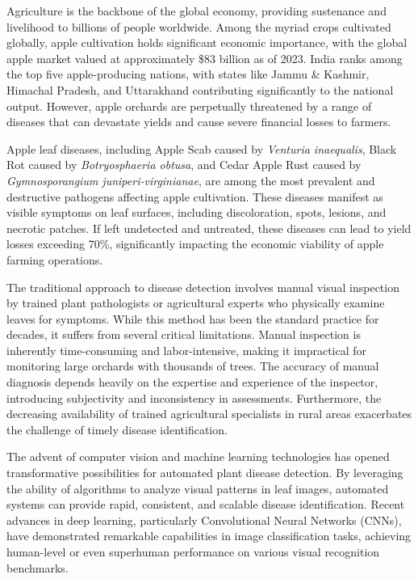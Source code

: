 \documentclass[12pt]{report}
\begin{document}
Agriculture is the backbone of the global economy, providing sustenance and livelihood to billions of people worldwide. Among the myriad crops cultivated globally, apple cultivation holds significant economic importance, with the global apple market valued at approximately \$83 billion as of 2023. India ranks among the top five apple-producing nations, with states like Jammu \& Kashmir, Himachal Pradesh, and Uttarakhand contributing significantly to the national output. However, apple orchards are perpetually threatened by a range of diseases that can devastate yields and cause severe financial losses to farmers.

Apple leaf diseases, including Apple Scab caused by \textit{Venturia inaequalis}, Black Rot caused by \textit{Botryosphaeria obtusa}, and Cedar Apple Rust caused by \textit{Gymnosporangium juniperi-virginianae}, are among the most prevalent and destructive pathogens affecting apple cultivation. These diseases manifest as visible symptoms on leaf surfaces, including discoloration, spots, lesions, and necrotic patches. If left undetected and untreated, these diseases can lead to yield losses exceeding 70\%, significantly impacting the economic viability of apple farming operations.

The traditional approach to disease detection involves manual visual inspection by trained plant pathologists or agricultural experts who physically examine leaves for symptoms. While this method has been the standard practice for decades, it suffers from several critical limitations. Manual inspection is inherently time-consuming and labor-intensive, making it impractical for monitoring large orchards with thousands of trees. The accuracy of manual diagnosis depends heavily on the expertise and experience of the inspector, introducing subjectivity and inconsistency in assessments. Furthermore, the decreasing availability of trained agricultural specialists in rural areas exacerbates the challenge of timely disease identification.

The advent of computer vision and machine learning technologies has opened transformative possibilities for automated plant disease detection. By leveraging the ability of algorithms to analyze visual patterns in leaf images, automated systems can provide rapid, consistent, and scalable disease identification. Recent advances in deep learning, particularly Convolutional Neural Networks (CNNs), have demonstrated remarkable capabilities in image classification tasks, achieving human-level or even superhuman performance on various visual recognition benchmarks.
\end{document}
